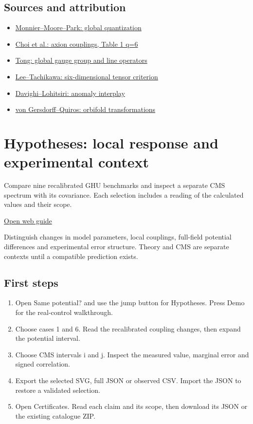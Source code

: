 \documentclass[11pt,a4paper]{article}
\begin{document}
\subsection*{Sources and attribution}
\begin{itemize}
\item \href{https://arxiv.org/abs/1711.04777}{Monnier--Moore--Park: global quantization}
\item \href{https://arxiv.org/abs/2309.03937}{Choi et al.: axion couplings, Table 1 q=6}
\item \href{https://arxiv.org/abs/1705.01853}{Tong: global gauge group and line operators}
\item \href{https://arxiv.org/abs/2012.11622}{Lee--Tachikawa: six-dimensional tensor criterion}
\item \href{https://arxiv.org/abs/2011.10102}{Davighi--Lohitsiri: anomaly interplay}
\item \href{https://arxiv.org/abs/hep-th/0305024}{von Gersdorff--Quiros: orbifold transformations}
\end{itemize}
\section{Hypotheses: local response and experimental context}
Compare nine recalibrated GHU benchmarks and inspect a separate CMS spectrum with its covariance. Each selection includes a reading of the calculated values and their scope.

\href{https://karlesmarin.github.io/ghu-explorer/guide/hypothesiscompare/index.html}{Open web guide}

Distinguish changes in model parameters, local couplings, full-field potential differences and experimental error structure. Theory and CMS are separate contexts until a compatible prediction exists.
\subsection*{First steps}
\begin{enumerate}
\item Open Same potential? and use the jump button for Hypotheses. Press Demo for the real-control walkthrough.
\item Choose cases 1 and 6. Read the recalibrated coupling changes, then expand the potential interval.
\item Choose CMS intervals i and j. Inspect the measured value, marginal error and signed correlation.
\item Export the selected SVG, full JSON or observed CSV. Import the JSON to restore a validated selection.
\item Open Certificates. Read each claim and its scope, then download its JSON or the existing catalogue ZIP.
\end{enumerate}
\end{document}
